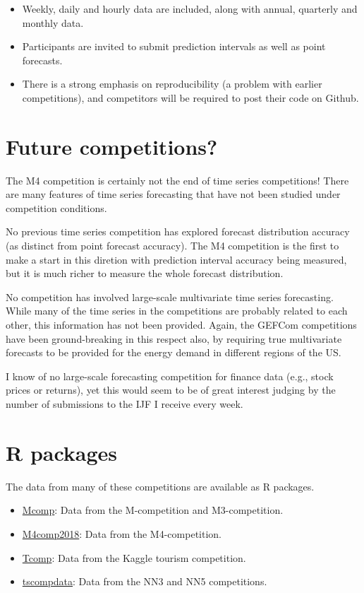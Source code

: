\documentclass[11pt,a4paper,]{article}
\providecommand{\tightlist}{%
  \setlength{\itemsep}{0pt}\setlength{\parskip}{0pt}}
\begin{document}
\begin{itemize}
\tightlist
\item
  Weekly, daily and hourly data are included, along with annual, quarterly and monthly data.
\item
  Participants are invited to submit prediction intervals as well as point forecasts.
\item
  There is a strong emphasis on reproducibility (a problem with earlier competitions), and competitors will be required to post their code on Github.
\end{itemize}

\hypertarget{future-competitions}{%
\section{Future competitions?}\label{future-competitions}}

The M4 competition is certainly not the end of time series competitions! There are many features of time series forecasting that have not been studied under competition conditions.

No previous time series competition has explored forecast distribution accuracy (as distinct from point forecast accuracy). The M4 competition is the first to make a start in this diretion with prediction interval accuracy being measured, but it is much richer to measure the whole forecast distribution.

No competition has involved large-scale multivariate time series forecasting. While many of the time series in the competitions are probably related to each other, this information has not been provided. Again, the GEFCom competitions have been ground-breaking in this respect also, by requiring true multivariate forecasts to be provided for the energy demand in different regions of the US.

I know of no large-scale forecasting competition for finance data (e.g., stock prices or returns), yet this would seem to be of great interest judging by the number of submissions to the IJF I receive every week.

\hypertarget{r-packages}{%
\section{R packages}\label{r-packages}}

The data from many of these competitions are available as R packages.

\begin{itemize}
\tightlist
\item
  \href{http://pkg.robjhyndman.com/Mcomp/}{Mcomp}: Data from the M-competition and M3-competition.
\item
  \href{https://github.com/carlanetto/M4comp2018}{M4comp2018}: Data from the M4-competition.
\item
  \href{https://cran.r-project.org/package=Tcomp}{Tcomp}: Data from the Kaggle tourism competition.
\item
  \href{https://github.com/robjhyndman/tscompdata}{tscompdata}: Data from the NN3 and NN5 competitions.
\end{itemize}
\end{document}
